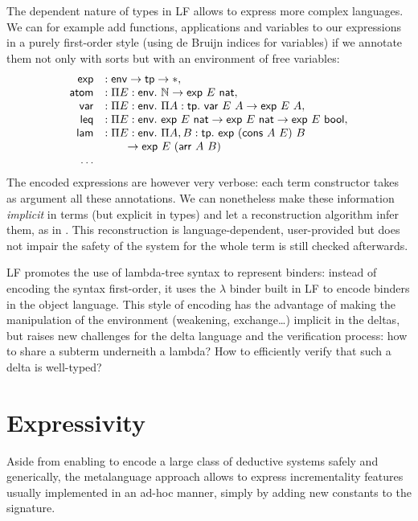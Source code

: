 \documentclass[9pt]{sigplanconf}
\begin{document}
The dependent nature of types in LF allows to express more complex
languages. We can for example add functions, applications and
variables to our expressions in a purely first-order style (using de
Bruijn indices for variables) if we annotate them not only with sorts
but with an environment of free variables:
$$
\begin{array}{rl}
  \mathsf{exp} &: \mathsf{env}\to \mathsf{tp}\to \type,\\
  \mathsf{atom} &: \prd E {\mathsf{env}} \nat\to \mathsf{exp}\ E\ \mathsf{nat},\\
  \mathsf{var} &: \prd E {\mathsf{env}} \prd A {\mathsf{tp}} \mathsf{var}\ E\ A \to \mathsf{exp}\ E\ A,\\
  \mathsf{leq} &: \prd E {\mathsf{env}} \mathsf{exp}\ E\ \mathsf{nat}\to \mathsf{exp}\ E\ \mathsf{nat}\to \mathsf{exp}\ E\ \mathsf{bool}, \\
  \mathsf{lam} &: \prd E {\mathsf{env}} \prd {A, B} {\mathsf{tp}}
  \mathsf{exp}\ (\mathsf{cons}\ A\ E)\ B \\ &
  \qquad\to\mathsf{exp}\ E\ (\mathsf{arr}\ A\ B)\\
  \ldots
\end{array}
$$
The encoded expressions are however very verbose: each term
constructor takes as argument all these annotations. We can
nonetheless make these information \emph{implicit} in terms (but
explicit in types) and let a reconstruction algorithm infer them, as
in \cite{necula1997efficient}. This reconstruction is
language-dependent, user-provided but does not impair the safety of
the system for the whole term is still checked afterwards.

LF promotes the use of lambda-tree syntax to represent binders:
instead of encoding the syntax first-order, it uses the $\lambda$
binder built in LF to encode binders in the object language. This
style of encoding has the advantage of making the manipulation of the
environment (weakening, exchange\ldots) implicit in the deltas, but
raises new challenges for the delta language and the verification
process: how to share a subterm underneith a lambda? How to
efficiently verify that such a delta is well-typed?

\section{Expressivity}

Aside from enabling to encode a large class of deductive systems
safely and generically, the metalanguage approach allows to express
incrementality features usually implemented in an ad-hoc manner,
simply by adding new constants to the signature.
\end{document}
